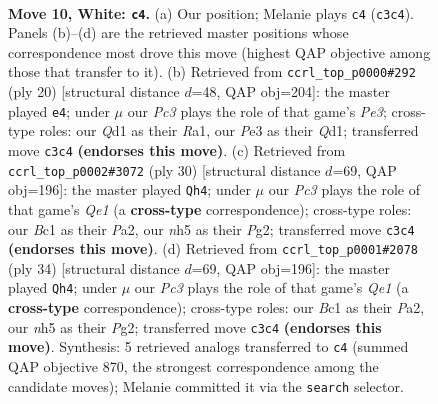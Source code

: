 \documentclass[11pt]{article}
\begin{document}
\clearpage

\begin{figure}[p]\centering
\begin{subfigure}{0.46\textwidth}\centering
\resizebox{\linewidth}{!}{%
\newchessgame
\chessboard[
  setfen={rnb2rk1/pp3ppp/4p3/2pq3n/3P4/2PBPN2/P4PPP/R1BQ1RK1 w - - 0 10},
  showmover=false,
  pgfstyle=straightmove, color=movearrow, markmove={c3-c4}
]}
\caption{}
\end{subfigure}\hfill
\begin{subfigure}{0.46\textwidth}\centering
\resizebox{\linewidth}{!}{%
\newchessgame
\chessboard[
  setfen={r1b2rk1/p3bppp/1pn1p3/2pq4/3P4/3BPN2/PP3PPP/R1BQR1K1 w - - 0 11},
  showmover=false,
  pgfstyle=straightmove, color=movearrow, markmove={e3-e4}
]}
\caption{}
\end{subfigure}
\\[4pt]
\begin{subfigure}{0.46\textwidth}\centering
\resizebox{\linewidth}{!}{%
\newchessgame
\chessboard[
  setfen={r1b2rk1/5ppp/p1p1pn2/3pq3/4P3/2NB1P2/PPP3PP/2KRQ2R w - - 0 16},
  showmover=false,
  pgfstyle=straightmove, color=movearrow, markmove={e1-h4}
]}
\caption{}
\end{subfigure}\hfill
\begin{subfigure}{0.46\textwidth}\centering
\resizebox{\linewidth}{!}{%
\newchessgame
\chessboard[
  setfen={r1b2rk1/5ppp/p1p1pn2/3pq3/4P3/2NB1P2/PPP3PP/2KRQ2R w - - 0 18},
  showmover=false,
  pgfstyle=straightmove, color=movearrow, markmove={e1-h4}
]}
\caption{}
\end{subfigure}
\caption{\textbf{Move 10, White: \texttt{c4}.} (a) Our position; Melanie plays \texttt{c4} (\texttt{c3c4}). Panels (b)--(d) are the retrieved master positions whose correspondence most drove this move (highest QAP objective among those that transfer to it). (b) Retrieved from \texttt{ccrl\_top\_p0000\#292} (ply 20) [structural distance $d$=48, QAP obj=204]: the master played \texttt{e4}; under $\mu$ our \emph{Pc3} plays the role of that game's \emph{Pe3}; cross-type roles: our \emph{Q}d1 as their \emph{R}a1, our \emph{P}e3 as their \emph{Q}d1; transferred move \texttt{c3c4} \textbf{(endorses this move)}. (c) Retrieved from \texttt{ccrl\_top\_p0002\#3072} (ply 30) [structural distance $d$=69, QAP obj=196]: the master played \texttt{Qh4}; under $\mu$ our \emph{Pc3} plays the role of that game's \emph{Qe1} (a \textbf{cross-type} correspondence); cross-type roles: our \emph{B}c1 as their \emph{P}a2, our \emph{n}h5 as their \emph{P}g2; transferred move \texttt{c3c4} \textbf{(endorses this move)}. (d) Retrieved from \texttt{ccrl\_top\_p0001\#2078} (ply 34) [structural distance $d$=69, QAP obj=196]: the master played \texttt{Qh4}; under $\mu$ our \emph{Pc3} plays the role of that game's \emph{Qe1} (a \textbf{cross-type} correspondence); cross-type roles: our \emph{B}c1 as their \emph{P}a2, our \emph{n}h5 as their \emph{P}g2; transferred move \texttt{c3c4} \textbf{(endorses this move)}. Synthesis: 5 retrieved analogs transferred to \texttt{c4} (summed QAP objective 870, the strongest correspondence among the candidate moves); Melanie committed it via the \texttt{search} selector.}
\label{fig:thought-m18}
\end{figure}
\end{document}
